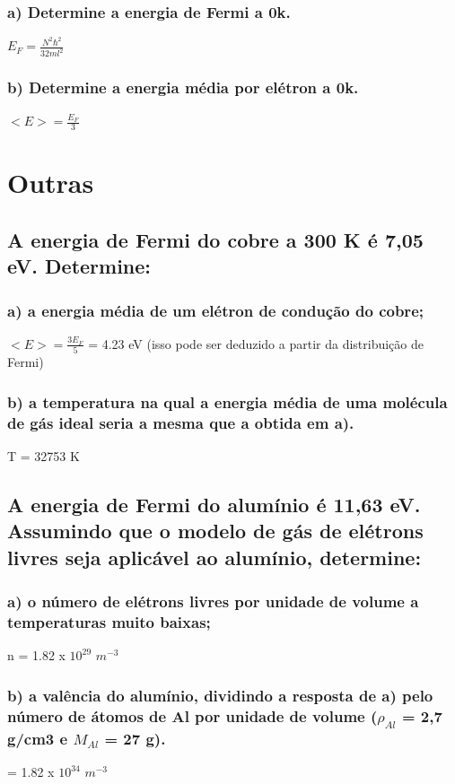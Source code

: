 \documentclass{article}
\begin{document}
\subsubsection{a) Determine a energia de Fermi a 0k.}
$E_F = \frac{N^2\hbar^2}{32 m l^2}$


\subsubsection{b) Determine a energia média por elétron a 0k.}
$<E> = \frac{E_F}{3}$
\section{Outras}

\subsection{A energia de Fermi do cobre a 300 K é 7,05 eV. Determine:}
\subsubsection{a) a energia média de um elétron de condução do cobre;}
$<E> = \frac{3 E_F}{5}$ = 4.23 eV
(isso pode ser deduzido a partir da distribuição de Fermi)

\subsubsection{b) a temperatura na qual a energia média de uma molécula de gás ideal seria a mesma que a obtida em a).}
T = 32753 K


\subsection{A energia de Fermi do alumínio é 11,63 eV. Assumindo que o modelo de gás de elétrons livres seja aplicável ao alumínio, determine:}

\subsubsection{a) o número de elétrons livres por unidade de volume a temperaturas muito baixas;}
n = 1.82 x $10^{29}$ $m^{-3}$
\subsubsection{b) a valência do alumínio, dividindo a resposta de a) pelo número de átomos de Al por unidade de volume ($\rho_{Al}$ = 2,7 g/cm3 e $M_{Al}$ = 27 g).}
 = 1.82 x $10^{34}$ $m^{-3}$
\end{document}
